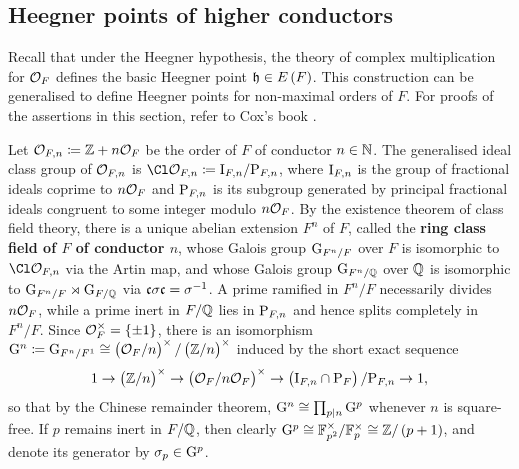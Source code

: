 \subsection{Heegner points of higher conductors}

Recall that under the Heegner hypothesis, the theory of complex multiplication for $ \OOO_F $ defines the basic Heegner point $ \hhh \in E\br{F} $. This construction can be generalised to define Heegner points for non-maximal orders of $ F $. For proofs of the assertions in this section, refer to Cox's book \cite{Cox89}.

Let $ \OOO_{F, n} \coloneqq \ZZ + n\OOO_F $ be the order of $ F $ of conductor $ n \in \NN $. The generalised ideal class group of $ \OOO_{F, n} $ is $ \Cl \OOO_{F, n} \coloneqq \I_{F, n} / \P_{F, n} $, where $ \I_{F, n} $ is the group of fractional ideals coprime to $ n\OOO_F $ and $ \P_{F, n} $ is its subgroup generated by principal fractional ideals congruent to some integer modulo $ n\OOO_F $. By the existence theorem of class field theory, there is a unique abelian extension $ F^n $ of $ F $, called the \textbf{ring class field of $ F $ of conductor $ n $}, whose Galois group $ \G_{F^n / F} $ over $ F $ is isomorphic to $ \Cl \OOO_{F, n} $ via the Artin map, and whose Galois group $ \G_{F^n / \QQ} $ over $ \QQ $ is isomorphic to $ \G_{F^n / F} \rtimes \G_{F / \QQ} $ via $ \ccc\sigma\ccc = \sigma^{-1} $. A prime ramified in $ F^n / F $ necessarily divides $ n\OOO_F $, while a prime inert in $ F / \QQ $ lies in $ \P_{F, n} $ and hence splits completely in $ F^n / F $. Since $ \OOO_F^\times = \cbr{\pm 1} $, there is an isomorphism $ \G^n \coloneqq \G_{F^n / F^1} \cong \br{\OOO_F / n}^\times / \br{\ZZ / n}^\times $ induced by the short exact sequence
$$ 1 \to \br{\ZZ / n}^\times \to \br{\OOO_F / n\OOO_F}^\times \to \br{\I_{F, n} \cap \P_F} / \P_{F, n} \to 1, $$
so that by the Chinese remainder theorem, $ \G^n \cong \prod_{p \mid n} \G^p $ whenever $ n $ is square-free. If $ p $ remains inert in $ F / \QQ $, then clearly $ \G^p \cong \FF_{p^2}^\times / \FF_p^\times \cong \ZZ / \br{p + 1} $, and denote its generator by $ \sigma_p \in \G^p $.

